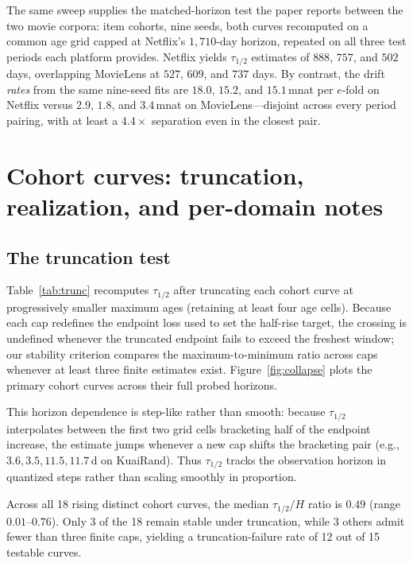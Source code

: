 \documentclass[10pt,letterpaper]{article}
\begin{document}
The same sweep supplies the matched-horizon test the paper reports between
the two movie corpora: item cohorts, nine seeds, both curves recomputed on a
common age grid capped at Netflix's $1{,}710$-day horizon, repeated on all
three test periods each platform provides. Netflix yields $\tau_{1/2}$ estimates of
$888$, $757$, and $502$ days, overlapping MovieLens at $527$, $609$, and $737$ days. By contrast, the
drift \emph{rates} from the same nine-seed fits are $18.0$, $15.2$, and $15.1$\,mnat
per $e$-fold on Netflix versus $2.9$, $1.8$, and $3.4$\,mnat on MovieLens---disjoint
across every period pairing, with at least a $4.4\times$ separation even in the closest pair.

\section{Cohort curves: truncation, realization, and per-domain notes}
\label{sup:cohorts}

\subsection{The truncation test}

Table~\ref{tab:trunc} recomputes $\tau_{1/2}$ after truncating each cohort curve
at progressively smaller maximum ages (retaining at least four age cells). Because
each cap redefines the endpoint loss used to set the half-rise target, the
crossing is undefined whenever the truncated endpoint fails to exceed the
freshest window; our stability criterion compares the maximum-to-minimum ratio
across caps whenever at least three finite estimates exist.
Figure~\ref{fig:collapse} plots the primary cohort curves across their full
probed horizons.

This horizon dependence is step-like rather than smooth: because $\tau_{1/2}$
interpolates between the first two grid cells bracketing half of the endpoint
increase, the estimate jumps whenever a new cap shifts the bracketing pair
(e.g., $3.6, 3.5, 11.5, 11.7$\,d on KuaiRand). Thus $\tau_{1/2}$ tracks the
observation horizon in quantized steps rather than scaling smoothly in proportion.

Across all 18 rising distinct cohort curves, the median $\tau_{1/2}/H$ ratio is
$0.49$ (range $0.01$--$0.76$). Only 3 of the 18 remain stable under truncation,
while 3 others admit fewer than three finite caps, yielding a truncation-failure
rate of 12 out of 15 testable curves.
\end{document}
